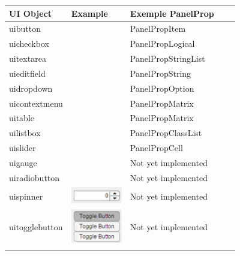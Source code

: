 \documentclass{tufte-handout}
\begin{document}
\newcommand{\addpicspinner}{\includegraphics[width=6em]{fig12.png}}
\newcommand{\addpictogglebutton}{\includegraphics[width=6em]{fig13.png}}
\begin{table}\sffamily
	\begin{tabular}{l*4{C}@{}}
		\toprule
		UI Object & Example & Exemple PanelProp \\ 
		\midrule
		uibutton & \addpicbutton & PanelPropItem \\ 
		uicheckbox & \addpiccheckbox & PanelPropLogical \\ 
		uitextarea  & \addpictextarea & PanelPropStringList \\
		uieditfield & \addpiceditfield & PanelPropString \\
		uidropdown & \addpicdropdown & PanelPropOption \\
		uicontextmenu & \addpiccontextmenu & PanelPropMatrix \\
		uitable & \addpictable & PanelPropMatrix \\
		uilistbox & \addpiclistbox & PanelPropClassList \\
		uislider & \addpicslider & PanelPropCell \\
		uigauge & \addpicgauge & Not yet implemented \\
		uiradiobutton & \addpicradiobutton & Not yet implemented \\
		uispinner & \addpicspinner & Not yet implemented \\
		uitogglebutton & \addpictogglebutton & Not yet implemented \\
		\bottomrule \\
	\end{tabular}
\end{table} 

%
%
\end{document}
